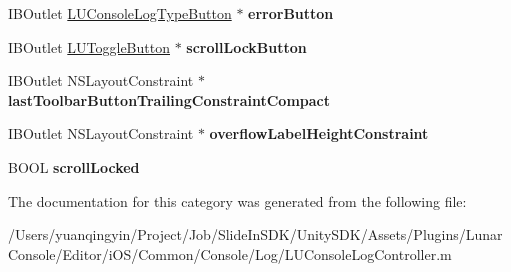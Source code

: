 \begin{DoxyCompactItemize}
I\+B\+Outlet \mbox{\hyperlink{interface_l_u_console_log_type_button}{L\+U\+Console\+Log\+Type\+Button}} $\ast$ {\bfseries error\+Button}
\item 
\mbox{\label{category_l_u_console_log_controller_07_08_a36077ec2d74e1cf596d8f181f55b98f2}} 
I\+B\+Outlet \mbox{\hyperlink{interface_l_u_toggle_button}{L\+U\+Toggle\+Button}} $\ast$ {\bfseries scroll\+Lock\+Button}
\item 
\mbox{\label{category_l_u_console_log_controller_07_08_a70a8d9e9a23ab0cc6b774c5d61d1f24b}} 
I\+B\+Outlet N\+S\+Layout\+Constraint $\ast$ {\bfseries last\+Toolbar\+Button\+Trailing\+Constraint\+Compact}
\item 
\mbox{\label{category_l_u_console_log_controller_07_08_a642928634493f729855b45101ba7af57}} 
I\+B\+Outlet N\+S\+Layout\+Constraint $\ast$ {\bfseries overflow\+Label\+Height\+Constraint}
\item 
\mbox{\label{category_l_u_console_log_controller_07_08_a819745268e56c2ef3b0eff03723673ba}} 
B\+O\+OL {\bfseries scroll\+Locked}
\end{DoxyCompactItemize}


The documentation for this category was generated from the following file\+:\begin{DoxyCompactItemize}
\item 
/\+Users/yuanqingyin/\+Project/\+Job/\+Slide\+In\+S\+D\+K/\+Unity\+S\+D\+K/\+Assets/\+Plugins/\+Lunar\+Console/\+Editor/i\+O\+S/\+Common/\+Console/\+Log/L\+U\+Console\+Log\+Controller.\+m\end{DoxyCompactItemize}
